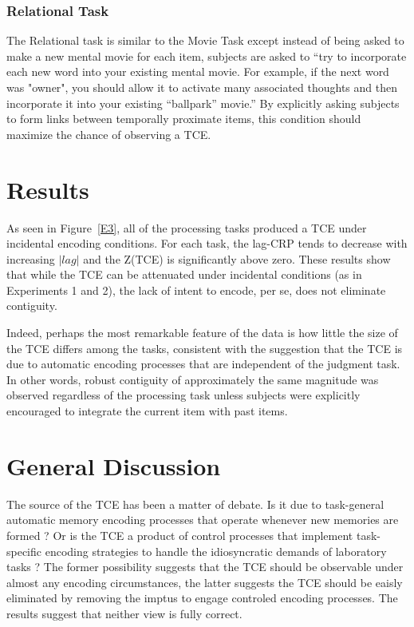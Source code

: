 \documentclass[jou,natbib]{apa6} %
\begin{document}
\subsubsection{Relational Task} The Relational task is similar to the Movie Task except instead of being asked to make a new mental movie for each item, subjects are asked to ``try to incorporate each new word into your existing mental movie. For example, if the next word was "owner", you should allow it to activate many associated thoughts and then incorporate it into your existing ``ballpark'' movie.'' By explicitly asking subjects to form links between temporally proximate items, this condition should maximize the chance of observing a TCE. 

\section{Results}

As seen in Figure~\ref{E3}, all of the processing tasks produced a TCE under incidental encoding conditions. For each task, the lag-CRP tends to decrease with increasing $|lag|$ and the Z(TCE) is significantly above zero. These results show that while the TCE can be attenuated under incidental conditions (as in Experiments 1 and 2), the lack of intent to encode, per se, does not eliminate contiguity. 

Indeed, perhaps the most remarkable feature of the data is how little the size of the TCE differs among the tasks, consistent with the suggestion that the TCE is due to automatic encoding processes that are independent of the judgment task. %
In other words, robust contiguity of approximately the same magnitude was observed regardless of the processing task unless subjects were explicitly encouraged to integrate the current item with past items.

\begin{figure*}%
\caption{The temporal contiguity effect (TCE) under incidental encoding with different judgment tasks. \paneltext}
\label{E3}
\end{figure*}

\section{General Discussion}
The source of the TCE has been a matter of debate. Is it due to task-general automatic memory encoding processes that operate whenever new memories are formed \citep{HealEtal14}? Or is the TCE a product of control processes that implement task-specific encoding strategies to handle the idiosyncratic demands of laboratory tasks \citep{Hint16}? The former possibility suggests that the TCE should be observable under almost any encoding circumstances, the latter suggests the TCE should be eaisly eliminated by removing the imptus to engage controled encoding processes. The results suggest that neither view is fully correct.
\end{document}
